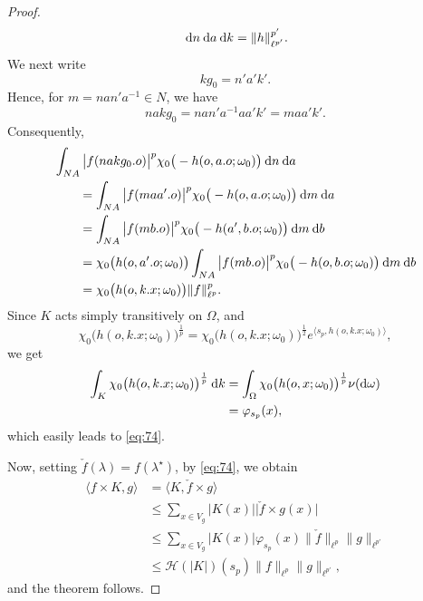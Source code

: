 \documentclass[11pt]{amsart}
\newcommand{\calH}{\mathcal{H}}
\newcommand{\vphi}{\varphi}
\newcommand{\sprod}[2]{\langle {#1}, {#2} \rangle}
\theoremstyle{plain}
\theoremstyle{definition}
\numberwithin{equation}{section}
\begin{document}
\begin{proof}
\begin{align*}
		{\: \rm d} n {\: \rm d} a {\: \rm d} k  = \|h\|_{\ell^{p'}}^{p'}.
	\end{align*}
	We next write
	\[
		k g_0 = n' a' k'.
	\]
	Hence, for $m = n a n' a^{-1} \in N$, we have
	\[
		n a k g_0 = n an'a^{-1} a a' k' = m a a' k'. 
	\]
	Consequently,
	\begin{align*}
		&
		\int_{N A} \big| f(nak g_0.o) \big|^p \chi_0\big(-h(o, a.o; \omega_0)\big) 
		{\: \rm d} n {\: \rm d} a \\
		&\qquad=
		\int_{N A} \big| f(m aa'.o) \big|^p \chi_0\big(-h(o, a.o; \omega_0)\big) 
		{\: \rm d} m {\: \rm d} a \\
		&\qquad=
		\int_{N A} \big| f(m b.o) \big|^p \chi_0\big(-h(a', b.o; \omega_0)\big)
		{\: \rm d} m {\: \rm d} b \\
		&\qquad=
		\chi_0\big(h(o, a'.o; \omega_0)\big) 
		\int_{N A} \big| f(m b.o) \big|^p \chi_0\big(-h(o, b.o; \omega_0)\big)
		{\: \rm d} m {\: \rm d} b\\
		&\qquad=
		\chi_0\big(h(o, k.x; \omega_0)\big) \|f\|_{\ell^p}^p.
	\end{align*}
	Since $K$ acts simply transitively on $\Omega$, and
	\[
		\chi_0\big(h(o, k.x; \omega_0)\big)^{\frac1p} = \chi_0\big(h(o, k.x; \omega_0)\big)^{\frac12}
		e^{\sprod{s_p}{h(o, k.x; \omega_0)}},
	\]
	we get
	\begin{align*}
		\int_K \chi_0\big(h(o, k.x; \omega_0)\big)^{\frac1p} {\: \rm d} k
		&=
		\int_\Omega 
		\chi_0\big(h(o, x; \omega_0)\big)^{\frac1p} \nu({\rm d} \omega) \\
		&=\vphi_{s_p}(x),
	\end{align*}
	which easily leads to \eqref{eq:74}. 

	Now, setting $\check{f}(\lambda) = f(\lambda^\star)$, by \eqref{eq:74}, we obtain
	\begin{align*}
		\sprod{f \times K}{g} 
		&=\sprod{K}{\check{f} \times g} \\
		&\leqslant \sum_{x \in V_g} |K(x)| \big| \check{f} \times g(x) \big| \\
		&\leqslant \sum_{x \in V_g} |K(x)| \vphi_{s_p}(x) \|\check{f}\|_{\ell^p} \|g\|_{\ell^{p'}} \\
		&\leqslant \calH(|K|)(s_p) \|f\|_{\ell^p} \|g\|_{\ell^{p'}},
	\end{align*}
	and the theorem follows.
\end{proof}
\end{document}
